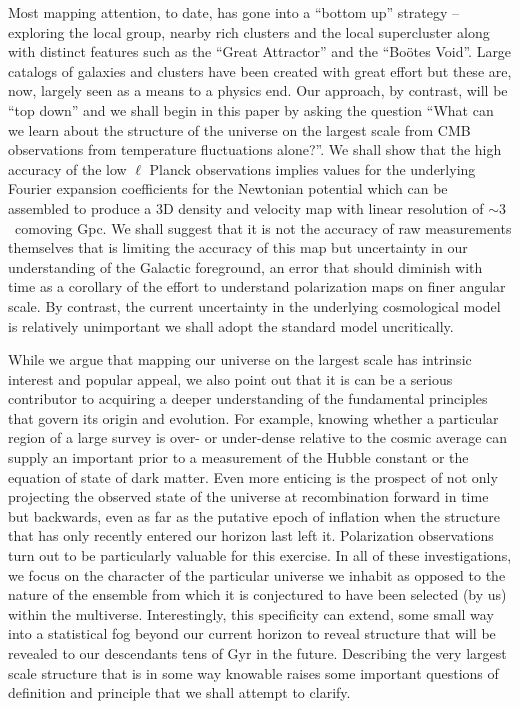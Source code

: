 \documentclass[useAMS,usenatbib,a4paper]{mn2e}
\begin{document}
Most mapping attention, to date, has gone into a
``bottom up'' strategy -- exploring the local group, nearby rich
clusters and the local supercluster along with distinct features such
as the ``Great Attractor'' and the ``Bo\"otes Void''. Large catalogs
of galaxies and clusters have been created with great effort but these
are, now, largely seen as a means to a physics end. Our approach, by
contrast, will be ``top down'' and we shall begin in this paper by
asking the question ``What can we learn about the structure of the
universe on the largest scale from CMB observations from temperature
fluctuations alone?''. We shall show that the high accuracy of the low
$\ell$ Planck observations implies values for the underlying Fourier
expansion coefficients for the Newtonian potential which can be
assembled to produce a 3D density and velocity map with linear
resolution of $\sim3$~comoving Gpc. We shall suggest that it is not
the accuracy of raw measurements themselves that is limiting the
accuracy of this map but uncertainty in our understanding of the
Galactic foreground, an error that should diminish with time as a
corollary of the effort to understand polarization maps on finer
angular scale. By contrast, the current uncertainty in the underlying
cosmological model is relatively unimportant we shall adopt the
standard model uncritically.

While we argue that mapping our universe on the largest scale has
intrinsic interest and popular appeal, we also point out that it is
can be a serious contributor to acquiring a deeper understanding of
the fundamental principles that govern its origin and evolution. For
example, knowing whether a particular region of a large survey is
over- or under-dense relative to the cosmic average can supply an
important prior to a measurement of the Hubble constant or the
equation of state of dark matter. Even more enticing is the prospect
of not only projecting the observed state of the universe at
recombination forward in time but backwards, even as far as the
putative epoch of inflation when the structure that has only recently
entered our horizon last left it. Polarization observations turn out
to be particularly valuable for this exercise. In all of these
investigations, we focus on the character of the particular universe
we inhabit as opposed to the nature of the ensemble from which it is
conjectured to have been selected (by us) within the multiverse.
Interestingly, this specificity can extend, some small way into a
statistical fog beyond our current horizon to reveal structure that
will be revealed to our descendants tens of Gyr in the future.
Describing the very largest scale structure that is in some way
knowable raises some important questions of definition and principle
that we shall attempt to clarify.
\end{document}
